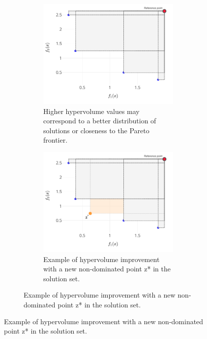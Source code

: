             \begin{figure}
                \centering
                \begin{subfigure}{\textwidth}
                    \begin{subfigure}{0.45\textwidth}
                        \includegraphics[width=\textwidth]{content/images/utility/hypervolume}
                        \caption{Higher hypervolume values may correspond to a better distribution of solutions or closeness to the Pareto frontier.}
                        \label{fig:hypervolume_basic}
                    \end{subfigure} 
                    \begin{subfigure}{0.45\textwidth}
                        \includegraphics[width=\textwidth]{content/images/utility/hypervolume_impr}
                        \caption{Example of hypervolume improvement with a new non-dominated point z* in the solution set.}
                        \label{fig:hypervolume_impr}
                    \end{subfigure} 
                \end{subfigure} 


\end{figure}
